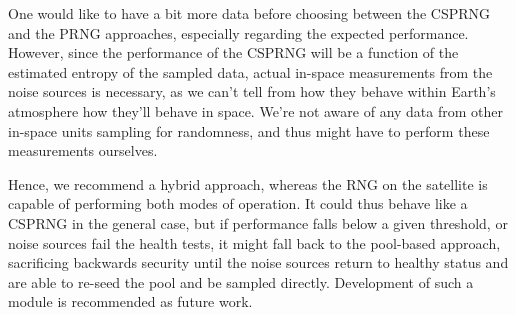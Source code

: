 One would like to have a bit more data before choosing between the CSPRNG and the PRNG approaches, especially regarding the expected performance. However, since the performance of the CSPRNG will be a function of the estimated entropy of the sampled data, actual in-space measurements from the noise sources is necessary, as we can't tell from how they behave within Earth's atmosphere how they'll behave in space. We're not aware of any data from other in-space units sampling for randomness, and thus might have to perform these measurements ourselves.

Hence, we recommend a hybrid approach, whereas the RNG on the satellite is capable of performing both modes of operation. It could thus behave like a CSPRNG in the general case, but if performance falls below a given threshold, or noise sources fail the health tests, it might fall back to the pool-based approach, sacrificing backwards security until the noise sources return to healthy status and are able to re-seed the pool and be sampled directly. Development of such a module is recommended as future work.
